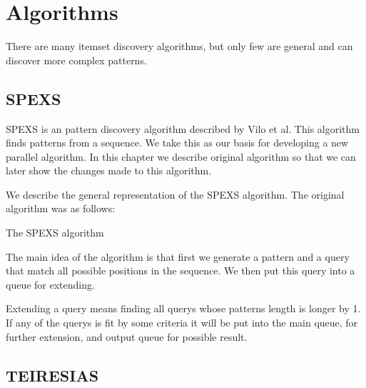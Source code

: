 \chapter{Algorithms}

There are many itemset discovery algorithms, but only few are general and can discover more complex patterns.

\section{SPEXS}

SPEXS is an pattern discovery algorithm described by Vilo et al.
This algorithm finds patterns from a sequence.
We take this as our basis for developing a new parallel algorithm.
In this chapter we describe original algorithm so that we can
later show the changes made to this algorithm.

We describe the general representation of the SPEXS algorithm. 
The original algorithm was as follows:


\begin{algorithm}[H]
	\caption{The SPEXS algorithm}
\begin{algorithmic}[1]



				\EndIf
			\EndIf
		\EndFor
	\EndWhile
\end{algorithmic}
\end{algorithm}

The main idea of the algorithm is that first we generate a 
pattern and a query that match all possible positions in 
the sequence. We then put this query into a queue for extending.

Extending a query means finding all querys whose patterns length
is longer by 1. If any of the querys is fit by some criteria
it will be put into the main queue, for further extension, 
and output queue for possible result.


\section{TEIRESIAS}

